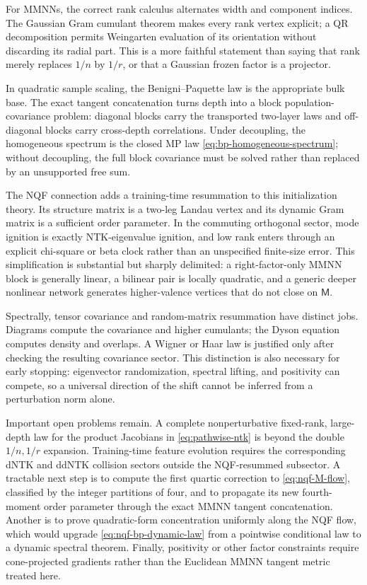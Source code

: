\documentclass{article}
\begin{document}
For MMNNs, the correct rank calculus alternates width and component indices.
The Gaussian Gram cumulant theorem makes every rank vertex explicit; a QR
decomposition permits Weingarten evaluation of its orientation without
discarding its radial part.  This is a more faithful statement than saying
that rank merely replaces \(1/n\) by \(1/r\), or that a Gaussian frozen
factor is a projector.

In quadratic sample scaling, the Benigni--Paquette law is the appropriate
bulk base.  The exact tangent concatenation turns depth into a block
population-covariance problem: diagonal blocks carry the transported
two-layer laws and off-diagonal blocks carry cross-depth correlations.  Under
decoupling, the homogeneous spectrum is the closed MP law
\eqref{eq:bp-homogeneous-spectrum}; without decoupling, the full block
covariance must be solved rather than replaced by an unsupported free sum.

The NQF connection adds a training-time resummation to this initialization
theory.  Its structure matrix is a two-leg Landau vertex and its dynamic Gram
matrix is a sufficient order parameter.  In the commuting orthogonal sector,
mode ignition is exactly NTK-eigenvalue ignition, and low rank enters through
an explicit chi-square or beta clock rather than an unspecified finite-size
error.  This simplification is substantial but sharply delimited: a
right-factor-only MMNN block is generally linear, a bilinear pair is locally
quadratic, and a generic deeper nonlinear network generates higher-valence
vertices that do not close on \(\mathsf M\).

Spectrally, tensor covariance and random-matrix resummation have distinct
jobs.  Diagrams compute the covariance and higher cumulants; the Dyson
equation computes density and overlaps.  A Wigner or Haar law is justified
only after checking the resulting covariance sector.  This distinction is
also necessary for early stopping: eigenvector randomization, spectral
lifting, and positivity can compete, so a universal direction of the shift
cannot be inferred from a perturbation norm alone.

Important open problems remain.  A complete nonperturbative fixed-rank,
large-depth law for the product Jacobians in \eqref{eq:pathwise-ntk} is beyond
the double \(1/n,1/r\) expansion.  Training-time feature evolution requires
the corresponding dNTK and ddNTK collision sectors outside the NQF-resummed
subsector.  A tractable next step is to compute the first quartic correction
to \eqref{eq:nqf-M-flow}, classified by the integer partitions of four, and
to propagate its new fourth-moment order parameter through the exact MMNN
tangent concatenation.  Another is to prove quadratic-form concentration
uniformly along the NQF flow, which would upgrade
\eqref{eq:nqf-bp-dynamic-law} from a pointwise conditional law to a dynamic
spectral theorem.  Finally, positivity or
other factor constraints require cone-projected gradients rather than the
Euclidean MMNN tangent metric treated here.
\end{document}
